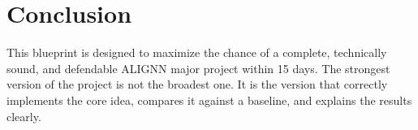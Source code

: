 \documentclass[12pt]{article}
\begin{document}
\section{Conclusion}
This blueprint is designed to maximize the chance of a complete, technically sound, and defendable ALIGNN major project within 15 days. The strongest version of the project is not the broadest one. It is the version that correctly implements the core idea, compares it against a baseline, and explains the results clearly.
\end{document}
